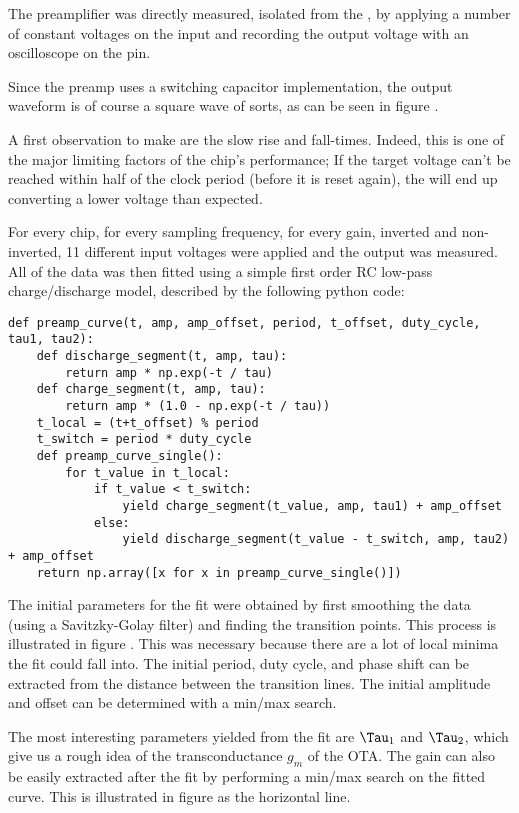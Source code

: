 The preamplifier was directly  measured, isolated from the \sdm, by applying a
number of constant voltages on the input and recording the output voltage with
an oscilloscope on the  pin.

Since the  preamp  uses  a  switching  capacitor  implementation,  the  output
waveform is of  course  a  square  wave  of  sorts,  as  can be seen in figure
.

A first observation to make are the slow rise and fall-times. Indeed,  this is
one  of the major limiting factors of the chip's performance;  If  the  target
voltage can't be reached within half of the clock period (before it  is  reset
again),  the  \sdm will end up  converting  a  lower  voltage  than  expected.

For  every  chip,  for  every sampling frequency, for every gain, inverted and
non-inverted,  11  different  input voltages were applied and the  output  was
measured.  All  of  the  data  was  then fitted using a simple first order  RC
low-pass charge/discharge model, described by the following python code:

\begin{verbatim}
def preamp_curve(t, amp, amp_offset, period, t_offset, duty_cycle, tau1, tau2):
    def discharge_segment(t, amp, tau):
        return amp * np.exp(-t / tau)
    def charge_segment(t, amp, tau):
        return amp * (1.0 - np.exp(-t / tau))
    t_local = (t+t_offset) % period
    t_switch = period * duty_cycle
    def preamp_curve_single():
        for t_value in t_local:
            if t_value < t_switch:
                yield charge_segment(t_value, amp, tau1) + amp_offset
            else:
                yield discharge_segment(t_value - t_switch, amp, tau2) + amp_offset
    return np.array([x for x in preamp_curve_single()])
\end{verbatim}

The initial parameters for the fit were obtained by first smoothing  the  data
(using a  Savitzky-Golay  filter)  and  finding  the  transition  points. This
process is illustrated  in  figure . This was necessary
because there are a lot  of  local minima the fit could fall into. The initial
period, duty cycle, and phase shift can be extracted from the distance between
the transition lines. The initial amplitude and  offset can be determined with
a min/max search.

The  most  interesting  parameters  yielded from  the  fit  are  $\Tau_1$  and
$\Tau_2$, which give us a rough idea of the transconductance $g_m$ of the OTA.
The gain can also be easily extracted after the fit by  performing  a  min/max
search on the  fitted  curve. This is illustrated in figure  as
the horizontal line.

